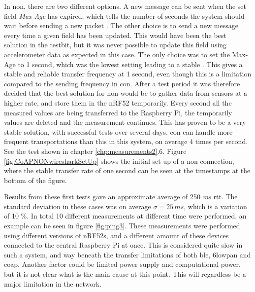\noindent In \gls{non}, there are two different options. A new message can be sent when the set field \textit{Max-Age} has expired, which tells the number of seconds the system should wait before sending a new packet \cite{shelby2014constrained}. The other choice is to send a new message every time a given field has been updated. This would have been the best solution in the testbit, but it was never possible to update this field using accelerometer data as expected in this case. The only choice was to set the Max-Age to 1 second, which was the lowest setting leading to a stable . This gives a stable and reliable transfer frequency at 1 second, even though this is a limitation compared to the sending frequency in \gls{con}. After a test period it was therefore decided that the best solution for \gls{non} would be to gather data from sensors at a higher rate, and store them in the \gls{nRF52} temporarily. Every second all the measured values are being transferred to the \gls{Raspberry Pi}, the temporarily values are deleted and the measurement continues. This has proven to be a very stable solution, with successful tests over several days. \gls{con} can handle more frequent transportations than this in this system, on average 4 times per second. See the test shown in chapter \ref{chp:measurements2}.6. Figure  \ref{fig:CoAPNONwiresharkSetUp} shows the initial set up of a \gls{non} connection, where the stable transfer rate of one second can be seen at the timestamps at the bottom of the figure. 





\noindent Results from these first tests gave an approximate average of 250 \textit{ms} \gls{rtt}. The standard deviation in these cases was on average $ \sigma = 25 \, ms $, which is a variation of 10 \%. In total 10 different measurements at different time were performed, an example can be seen in figure \ref{fig:ping3}. These measurements were performed using different versions of \glspl{nRF52}, and a different amount of these devices connected to the central Raspberry Pi at once. This is considered quite slow in such a system, and way beneath the transfer limitations of both \gls{ble}, \gls{6lowpan} and \gls{coap}. Another factor could be limited power supply and computational power, but it is not clear what is the main cause at this point. This will regardless be a major limitation in the network.

